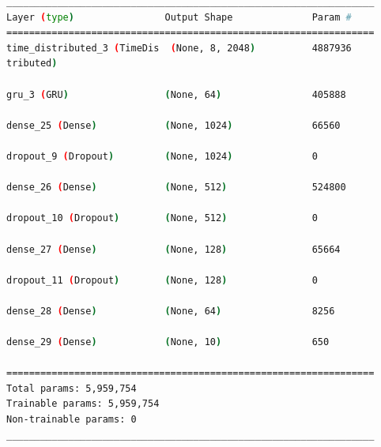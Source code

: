 \begin{lstlisting}[language=Bash,caption={Overview of layers in Custom Convolutional LTSM network.},label={lst:custom_conv_lstm_layers},numbers=none,float=htb]
_________________________________________________________________
Layer (type)                Output Shape              Param #   
=================================================================
time_distributed_3 (TimeDis  (None, 8, 2048)          4887936   
tributed)                                                       
                                                                
gru_3 (GRU)                 (None, 64)                405888    
                                                                
dense_25 (Dense)            (None, 1024)              66560     
                                                                
dropout_9 (Dropout)         (None, 1024)              0         
                                                                
dense_26 (Dense)            (None, 512)               524800    
                                                                
dropout_10 (Dropout)        (None, 512)               0         
                                                                
dense_27 (Dense)            (None, 128)               65664     
                                                                
dropout_11 (Dropout)        (None, 128)               0         
                                                                
dense_28 (Dense)            (None, 64)                8256      
                                                                
dense_29 (Dense)            (None, 10)                650       
                                                                
=================================================================
Total params: 5,959,754
Trainable params: 5,959,754
Non-trainable params: 0
_________________________________________________________________
\end{lstlisting}

